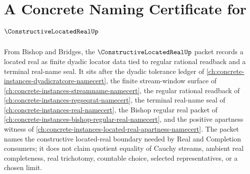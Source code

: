\chapter{A Concrete Naming Certificate for $\ConstructiveLocatedRealUp$}
\label{ch:concrete-instances-constructive-located-real-namecert}

From Bishop and Bridges, the $\ConstructiveLocatedRealUp$ packet records a located real as finite dyadic locator data tied to regular rational readback and a terminal real-name seal. It sits after the dyadic tolerance ledger of \autoref{ch:concrete-instances-dyadicratcore-namecert}, the finite stream-window surface of \autoref{ch:concrete-instances-streamname-namecert}, the regular rational readback of \autoref{ch:concrete-instances-regseqrat-namecert}, the terminal real-name seal of \autoref{ch:concrete-instances-real-namecert}, the Bishop regular real packet of \autoref{ch:concrete-instances-bishop-regular-real-namecert}, and the positive apartness witness of \autoref{ch:concrete-instances-located-real-apartness-namecert}. The packet names the constructive located-real boundary needed by Real and Completion consumers; it does not claim quotient equality of Cauchy streams, ambient real completeness, real trichotomy, countable choice, selected representatives, or a chosen limit.

